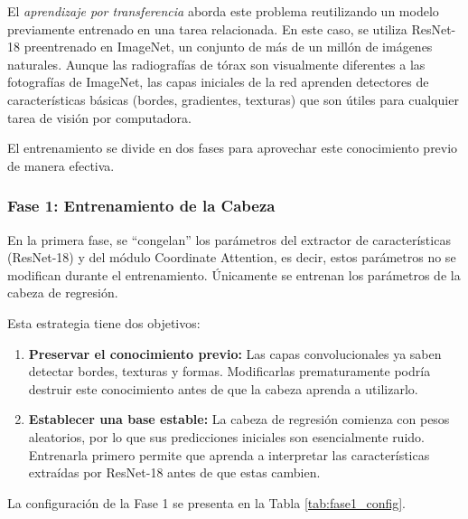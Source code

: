 El \textit{aprendizaje por transferencia} \cite{yosinski2014transferable} aborda este problema reutilizando un modelo previamente entrenado en una tarea relacionada. En este caso, se utiliza ResNet-18 preentrenado en ImageNet, un conjunto de más de un millón de imágenes naturales. Aunque las radiografías de tórax son visualmente diferentes a las fotografías de ImageNet, las capas iniciales de la red aprenden detectores de características básicas (bordes, gradientes, texturas) que son útiles para cualquier tarea de visión por computadora.

El entrenamiento se divide en dos fases para aprovechar este conocimiento previo de manera efectiva.

\subsubsection{Fase 1: Entrenamiento de la Cabeza}

En la primera fase, se ``congelan'' los parámetros del extractor de características (ResNet-18) y del módulo Coordinate Attention, es decir, estos parámetros no se modifican durante el entrenamiento. Únicamente se entrenan los parámetros de la cabeza de regresión.

Esta estrategia tiene dos objetivos:

\begin{enumerate}
    \item \textbf{Preservar el conocimiento previo:} Las capas convolucionales ya saben detectar bordes, texturas y formas. Modificarlas prematuramente podría destruir este conocimiento antes de que la cabeza aprenda a utilizarlo.

    \item \textbf{Establecer una base estable:} La cabeza de regresión comienza con pesos aleatorios, por lo que sus predicciones iniciales son esencialmente ruido. Entrenarla primero permite que aprenda a interpretar las características extraídas por ResNet-18 antes de que estas cambien.
\end{enumerate}

La configuración de la Fase 1 se presenta en la Tabla \ref{tab:fase1_config}.

